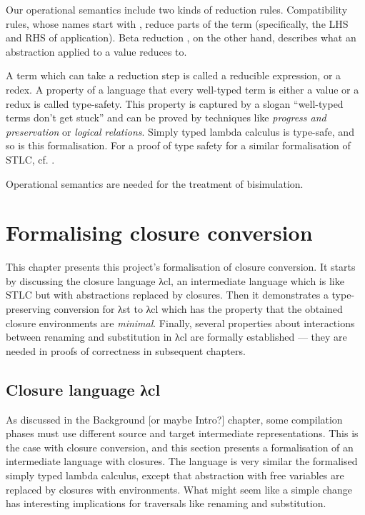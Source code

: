 \documentclass[bsc,frontabs,oneside,singlespacing,parskip,deptreport]{infthesis}
\theoremstyle{definition}
\theoremstyle{lemma}
\begin{document}
Our operational semantics include two kinds of reduction rules. Compatibility rules, whose
names start with , reduce parts of the term (specifically, the LHS
and RHS of application). Beta reduction , on the other hand,
describes what an abstraction applied to a value reduces to.


A term which can take a reduction step is called a reducible
expression, or a redex. A property of a language that every well-typed
term is either a value or a redux is called type-safety. This property
is captured by a slogan ``well-typed terms don't get stuck'' and can
be proved by techniques like \textit{progress and preservation} or
\textit{logical relations}. Simply typed lambda calculus is type-safe,
and so is this formalisation. For a proof of type safety for a similar
formalisation of STLC, cf. \cite{DBLP:conf/sbmf/Wadler18}.

Operational semantics are needed for the treatment of bisimulation.

\chapter{Formalising closure conversion}
\label{cha:agda-development}

This chapter presents this project's formalisation of closure
conversion. It starts by discussing the closure language λcl, an
intermediate language which is like STLC but with abstractions
replaced by closures. Then it demonstrates a type-preserving
conversion for λst to λcl which has the property that the obtained
closure environments are \textit{minimal}.  Finally, several
properties about interactions between renaming and substitution in λcl
are formally established --- they are needed in proofs of correctness
in subsequent chapters.

\section{Closure language λcl}
\label{sec:closure-language-cl}

As discussed in the Background [or maybe Intro?] chapter, some
compilation phases must use different source and target intermediate
representations. This is the case with closure conversion, and this
section presents a formalisation of an intermediate language with
closures. The language is very similar the formalised simply typed
lambda calculus, except that abstraction with free variables are
replaced by closures with environments. What might seem like a simple
change has interesting implications for traversals like renaming and
substitution.
\end{document}
